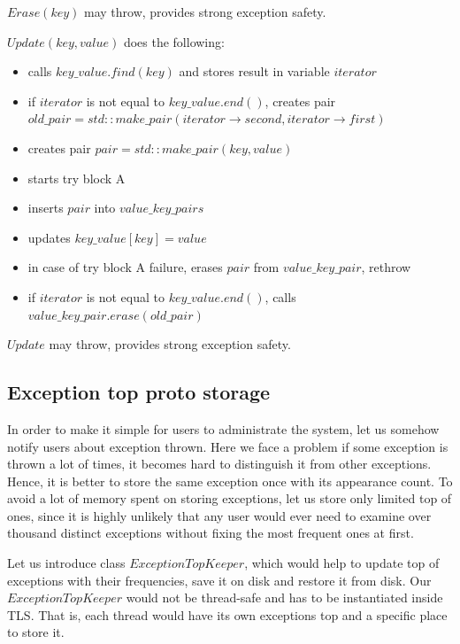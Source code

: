 \documentclass{article}
\begin{document}
$Erase(key)$ may throw, provides strong exception safety.

$Update(key, value)$ does the following:
\begin{itemize}
	\item calls $key\_value.find(key)$ and stores result in variable $iterator$
	\item if $iterator$ is not equal to $key\_value.end()$, creates pair \\
		$old\_pair = std{::}make\_pair(iterator\rightarrow second, iterator\rightarrow first)$
	\item creates pair $pair = std{::}make\_pair(key, value)$
	\item starts try block A
	\item inserts $pair$ into $value\_key\_pairs$
	\item updates $key\_value[key] = value$
	\item in case of try block A failure, erases $pair$ from $value\_key\_pair$, rethrow
	\item if $iterator$ is not equal to $key\_value.end()$, calls $value\_key\_pair.erase(old\_pair)$
\end{itemize}

$Update$ may throw, provides strong exception safety.

\subsection{Exception top proto storage}
\label{subsec:exception_top_proto_storage}
In order to make it simple for users to administrate the system, let us somehow notify users about exception thrown. Here we face a problem if some exception is thrown a lot of times, it becomes hard to distinguish it from other exceptions. Hence, it is better to store the same exception once with its appearance count. To avoid a lot of memory spent on storing exceptions, let us store only limited top of ones, since it is highly unlikely that any user would ever need to examine over thousand distinct exceptions without fixing the most frequent ones at first.

Let us introduce class $ExceptionTopKeeper$, which would help to update top of exceptions with their frequencies, save it on disk and restore it from disk. Our $ExceptionTopKeeper$ would not be thread-safe and has to be instantiated inside TLS. That is, each thread would have its own exceptions top and a specific place to store it.
\end{document}
